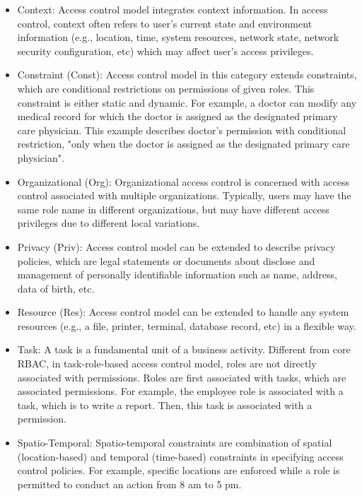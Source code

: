 \begin{itemize}

  \item Context: Access control model integrates context information. In access control, context often refers to user's current state and environment information (e.g., location, time, system resources, network state, network security configuration, etc) which may affect user's access privileges.

  \item Constraint (Const): Access control model in this category extends constraints, which are conditional restrictions on permissions of given roles. This constraint is either static and dynamic. For example, a doctor can modify any medical record for which the doctor is assigned as the designated primary care physician. This example describes doctor's permission with conditional restriction, "only when the doctor is assigned as the designated primary care physician".

  \item Organizational (Org): Organizational access control is concerned with access control associated with multiple organizations. Typically, users may have the same role name in different organizations, but may have different access privileges due to different local variations.
  
  \item Privacy (Priv): Access control model can be extended to describe privacy policies, which are legal statements or documents about disclose and management of personally identifiable information such as name, address, data of birth, etc.

  \item Resource (Res): Access control model can be extended to handle any system resources (e.g., a file, printer, terminal, database record, etc) in a flexible way. 
  
  \item Task: A task is a fundamental unit of a business activity. Different from core RBAC, in task-role-based access control model, roles are not directly associated with permissions. Roles are first associated with tasks, which are associated permissions. For example, the employee role is associated with a task, which is to write a report. Then, this task is associated with a permission.

  \item Spatio-Temporal: Spatio-temporal constraints are combination of spatial (location-based) and temporal (time-based) constraints in specifying access control policies. For example, specific locations are enforced while a role is permitted to conduct an action from 8 am to 5 pm.


\end{itemize}
